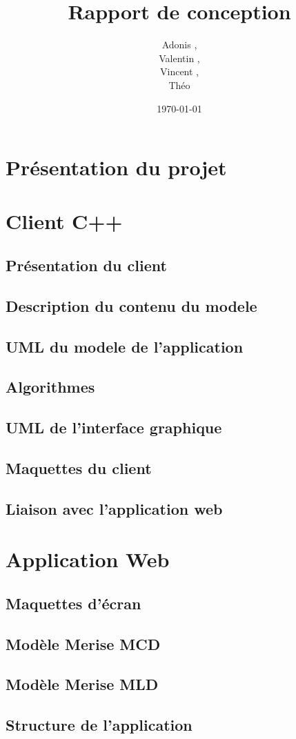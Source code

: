 \documentclass[a4paper]{article}
\title{Rapport de conception}
\author{Adonis \bsc{Najimi},\\
 Valentin \bsc{Stern},\\
 Vincent \bsc{Albert},\\
 Théo \bsc{Gerriet}}
\date{\today}
\begin{document}
\maketitle
\newpage

\section{Présentation du projet}
\section{Client C++}
	\subsection{Présentation du client}
	\subsection{Description du contenu du modele}
		
	\subsection{UML du modele de l'application}
		
	\subsection{Algorithmes}
		
	\subsection{UML de l'interface graphique}
		
	\subsection{Maquettes du client}
		
	\subsection{Liaison avec l'application web}
		
\section{Application Web}
	\subsection{Maquettes d'écran}
		
	\subsection{Modèle Merise MCD}
		
	\subsection{Modèle Merise MLD}
		
	\subsection{Structure de l'application}
		

\newpage
\tableofcontents
\end{document}
